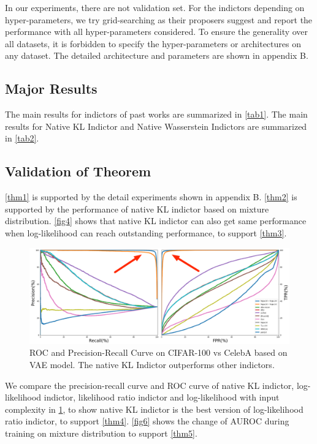 \documentclass[letterpaper]{article} %
\begin{document}
In our experiments, there are not validation set. For the indictors depending on hyper-parameters, we try grid-searching as their proposers suggest and report the performance with all hyper-parameters considered. To ensure the generality over all datasets, it is forbidden to specify the hyper-parameters or architectures on any dataset. 
The detailed architecture and parameters are shown in appendix B. 

\subsection{Major Results}

The main results for indictors of past works are summarized in \cref{tab1}. The main results for Native KL Indictor and Native Wasserstein Indictors are summarized in \cref{tab2}. 

\subsection{Validation of Theorem}

\cref{thm1} is supported by the detail experiments shown in appendix B. \cref{thm2} is supported by the performance of native KL indictor based on mixture distribution. 
\cref{fig4} shows that native KL indictor can also get same performance when log-likelihood can reach outstanding performance, to support \cref{thm3}. 

\begin{figure}
	\includegraphics[width=1.0\columnwidth]{roc_prc}
	\caption{ROC and Precision-Recall Curve on CIFAR-100 vs CelebA based on VAE model. The native KL Indictor outperforms other indictors. }
	\label{fig5}
\end{figure}

We compare the precision-recall curve and ROC curve of native KL indictor, log-likelihood indictor, likelihood ratio indictor and log-likelihood with input complexity in \cref{fig5}, to show native KL indictor is the best version of log-likelihood ratio indictor, to support \cref{thm4}. \cref{fig6} shows the change of AUROC during training on mixture distribution to support \cref{thm5}. 
\end{document}
